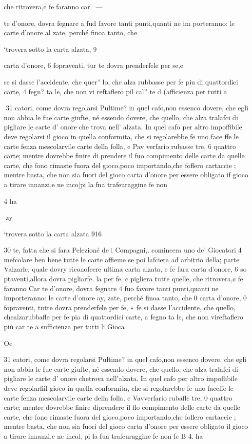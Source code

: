 \documentclass[12pt,a6paper]{article}
\begin{document}
che ritrovera,¢ fe faranno car~ —

te d’onore, dovra fegnare a fud
favore tanti punti,quanti ne im
porteranno: le carte d’onore al
zate, perché finoa tanto, che

‘trovera sotto la carta alzata, 9

carta d’onore, 6 fopraventi, tur
te dovra prenderfele per se,e

se si dasse l’accidente, che quer”
lo, che alza rubbasse per fe piu
di quattordici carte, 4 fegn? ta
le, che non vi reftaflero pil cal”
te d (afficienza pet tutti a

 
31
catori, come dovra regolarsi
Pultime? in quel cafo,non essenco dovere, che egli non abbia
le fue carte giufte, né essendo
dovere, che quello, che alza
tralafci di pigliare le carte d’
onore che trova nell’ alzata. In
quel cafo per altro impoffibile
deve regolarsi il gioco in quella
conformita, che si regolarebbe
fe uno face ffe le carte fenza mescolarvile carte della folla, e
Pav verfario rubasse tre, 6 quattro carte; mentre dovrebbe
finire di prendere il fuo compimento delle carte da quelle
carte, che fono rimaste fuora
del gioco,poco importando,che
foflero cartaccie ; mentre basta,
che non sia fuori del gioco carta d’onore per essere obligato if
gioco a tirare innanzi,e ne inco]pi la fna trafeuraggine fe non

4 ha

 

 
zy

‘trovera sotto la carta alzata 916

30
te, fatta che si fara Pelezioné
de i Compagni,. comincera uno
de’ Giocatori 4 mefcolare ben
bene tutte le carte affieme se
poi lafciera ad arbitrio della;
parte Valzarle, quale dovry
riconofcere ultima carta alzata, e fe fara carta d’onore, 6 so
ptaventi,allora dovra pigliarfe.
la per fe, ¢ pigliera tutte quelle,
che ritrovera,¢ fe faranno Car
te d’onore, dovra fegnare 4 fuo
favore tanti punti,quanti ne importeranno: le carte d’onore ay,
zate, perché finoa tanto, che
0
carta d’onore, 0 fopraventi, tutte dovra prenderfele per fe, «
fe si dasse l’accidente, che quello, chealzarubbafle per fe pia
di quattordici carte, a fegno ta
le, che non vireftaflero più car
te a sufficienza per tutti li Gioca 

Oe

31
eatori, come dovra regolarsi
Pultime? in quel cafo,non essenco dovere, che egli non abbia
le fue carte giufte, né essendo
dovere, che quello, che alza
tralafci di pigliare le carte d’
onore chetrova nell’alzata. In
quel cafo per altro impoflibile
deve regolarfiil gioco in quella
conformita, che si regolarebbe
fe uno faceffe le carte fenza mescolarvile carte della folla, e
Vavverfario rubafle tre, 0 quattro carte; mentre dovrebbe
finire diprendere il flo compimento delle carte da quelle
carte, che fono rimaste fuora
del gioco,poco importando,che
follero cartaccie ; mentre basta,
che non sia fuori del gioco carta d’onore per essere obligato il
gioco a tirare innanzi,e ne incol, pi la fua trafeuraggine fe non
fe B 4. ha
 
\end{document}
